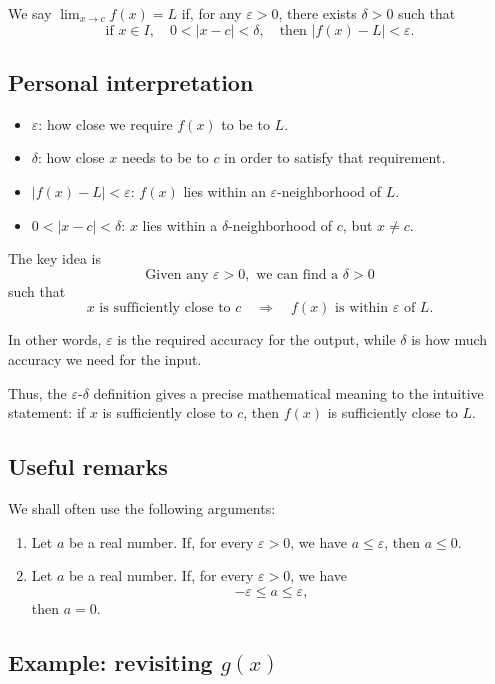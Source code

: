 \documentclass[12pt]{article}
\begin{document}
We say $\lim_{x\to c}f(x)=L$ if, for any $\varepsilon>0$, there exists $\delta>0$ such that
\[
\text{if }x\in I,\quad 0<|x-c|<\delta,
\quad\text{then }|f(x)-L|<\varepsilon.
\]

\subsection*{Personal interpretation}

\begin{itemize}
\item $\varepsilon$: how close we require $f(x)$ to be to $L$.
\item $\delta$: how close $x$ needs to be to $c$ in order to satisfy that requirement.
\item $|f(x)-L|<\varepsilon$: $f(x)$ lies within an $\varepsilon$-neighborhood of $L$.
\item $0<|x-c|<\delta$: $x$ lies within a $\delta$-neighborhood of $c$, but $x\ne c$.
\end{itemize}

The key idea is
\[
\boxed{\text{Given any }\varepsilon>0,\text{ we can find a }\delta>0}
\]
such that
\[
x\text{ is sufficiently close to }c
\quad\Longrightarrow\quad
f(x)\text{ is within }\varepsilon\text{ of }L.
\]

In other words, $\varepsilon$ is the required accuracy for the output, while $\delta$ is how much accuracy we need for the input.

Thus, the $\varepsilon$-$\delta$ definition gives a precise mathematical meaning to the intuitive statement: if $x$ is sufficiently close to $c$, then $f(x)$ is sufficiently close to $L$.

\subsection*{Useful remarks}

We shall often use the following arguments:
\begin{enumerate}[label=(\roman*)]
\item Let $a$ be a real number. If, for every $\varepsilon>0$, we have $a\leq\varepsilon$, then $a\leq0$.
\item Let $a$ be a real number. If, for every $\varepsilon>0$, we have
\[
-\varepsilon\leq a\leq\varepsilon,
\]
then $a=0$.
\end{enumerate}

\subsection*{Example: revisiting $g(x)$}
\end{document}
